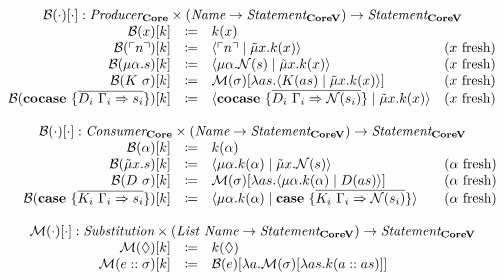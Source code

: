 \[
  \begin{array}{rcll}
    \multicolumn{4}{c}{\bind{\cdot}{\cdot} : \emph{Producer}_{\targetlang{}} \times (\emph{Name} \rightarrow \emph{Statement}_{\targetvar{}}) \rightarrow \emph{Statement}_{\targetvar{}}}\\
    \bind{x}{k} & \coloneq & k(x) & \\
    \bind{\lit{n}}{k} & \coloneq & \cut{\lit{n}}{\tilde{\mu}x.k(x)} & \fresh{x} \\
    \bind{\mu\alpha.s}{k} & \coloneq & \cut{\mu\alpha.\name{s}}{\tilde{\mu}x.k(x)} & \fresh{x} \\
    \bind{K\ \sigma}{k} & \coloneq & \binds{\sigma}{\lambda as.\cut{K(as)}{\tilde{\mu}x.k(x)}} & \fresh{x} \\
    \bind{\cocase{\overline{D_i\ \Gamma_i \Rightarrow s_i}}}{k} & \coloneq & \cut{\cocase{\overline{D_i\ \Gamma_i \Rightarrow \name{s_i}}}}{\tilde{\mu}x.k(x)} & \fresh{x} \\
    \\
    \multicolumn{4}{c}{\bind{\cdot}{\cdot} : \emph{Consumer}_{\targetlang{}} \times (\emph{Name} \rightarrow \emph{Statement}_{\targetvar{}}) \rightarrow \emph{Statement}_{\targetvar{}}}\\
    \bind{\alpha}{k} & \coloneq & k(\alpha) & \\
    \bind{\tilde{\mu}x.s}{k} & \coloneq & \cut{\mu\alpha.k(\alpha)}{\tilde{\mu}x.\name{s}} & \fresh{\alpha} \\
    \bind{D\ \sigma}{k} & \coloneq & \binds{\sigma}{\lambda as.\cut{\mu\alpha.k(\alpha)}{D(as)}} & \fresh{\alpha} \\
    \bind{\case{\overline{K_i\ \Gamma_i \Rightarrow s_i}}}{k} & \coloneq & \cut{\mu\alpha.k(\alpha)}{\case{\overline{K_i\ \Gamma_i \Rightarrow \name{s_i}}}} & \fresh{\alpha} \\
    \\
    \multicolumn{4}{c}{\binds{\cdot}{\cdot} : \emph{Substitution} \times (\emph{List Name} \rightarrow \emph{Statement}_{\targetvar{}}) \rightarrow \emph{Statement}_{\targetvar{}}}\\
    \binds{\nil}{k} & \coloneq & k(\nil) & \\
    \binds{e :: \sigma}{k} & \coloneq & \bind{e}{\lambda a.\binds{\sigma}{\lambda as.k(a :: as)}} & \\
  \end{array}
\]
